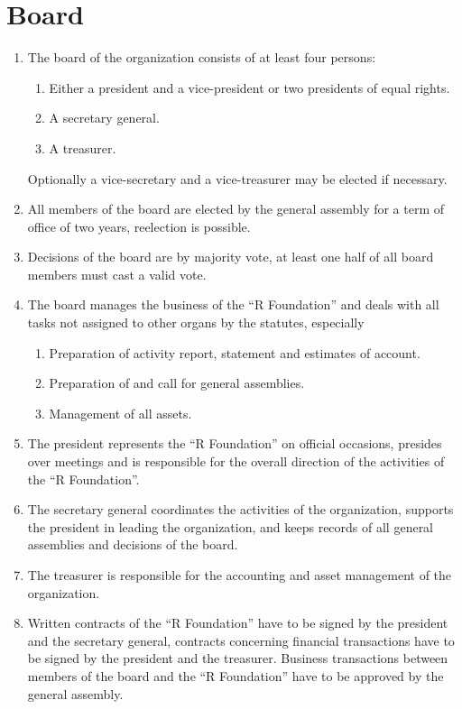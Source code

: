 \documentclass[a4paper]{article}
\newcommand{\RF}{``R Foundation''}
\begin{document}
\section{Board}

\begin{enumerate}
  \item
   The board of the organization consists of at least four
   persons:
   \begin{enumerate}
    \item Either a president and a vice-president or two presidents of
     equal rights.
    \item A secretary general.
    \item A treasurer.
   \end{enumerate}
   Optionally a vice-secretary and a vice-treasurer may be elected if
   necessary.
   
  \item All members of the board are elected by the general assembly
   for a term of office of two years, reelection is possible.
   
  \item Decisions of the board are by majority vote, at least one half
   of all board members must cast a valid vote.
   
  \item The board manages the business of the \RF{} and deals with all
   tasks not assigned to other organs by the statutes, especially
   \begin{enumerate}
    \item Preparation of activity report, statement and estimates of
     account. 
    \item Preparation of and call for general assemblies.
    \item Management of all assets.
  \end{enumerate}
  
 \item The president represents the \RF{} on official occasions,
  presides over meetings and is responsible for the overall direction
  of the activities of the \RF{}.
  
 \item The secretary general coordinates the activities of the
  organization, supports the president in leading the organization,
  and keeps records of all general assemblies and decisions of the
  board.
  
 \item The treasurer is responsible for the accounting and asset
  management of the organization.
  
 \item Written contracts of the \RF{} have to be signed by the
  president and the secretary general, contracts concerning financial
  transactions have to be signed by the president and the
  treasurer. Business transactions between members of the board and the
  \RF{} have to be approved by the general assembly.
\end{enumerate}
\end{document}
